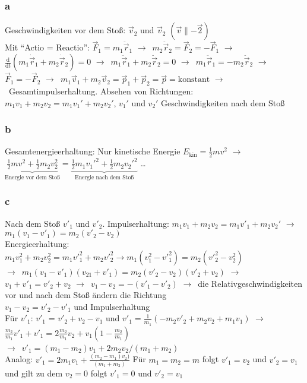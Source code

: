 \documentclass[oneside]{book}
\theoremstyle{definition}
\newcommand{\conseq}{$\rightarrow$~}
\renewcommand{\d}{\mathrm d}
\newcommand{\dd}[1]{\frac{\d}{\d #1}}
\newcommand{\dotvec}[1]{\dot{\vec{#1}}}
\newcommand{\ddotvec}[1]{\ddot{\vec{#1}}}
\begin{document}
\subsubsection{a}
Geschwindigkeiten vor dem Stoß: $\vec{v}_2$ und $\vec{v}_2$ $(\vec{v} \parallel - \vec{2})$\\
Mit "`Actio = Reactio"': $\vec{F}_1 = m_1 \ddotvec{r}_1$ \conseq $m_2 \ddotvec{r}_2 = \vec{F}_2 = - \vec{F}_1$ \conseq $\dd t (m_1 \dotvec{r}_1 + m_2 \dotvec{r}_2) = 0$ \conseq $m_1 \ddotvec{r}_1 + m_2 \ddotvec{r}_2 = 0$ \conseq $m_1 \ddotvec{r}_1 = -m_2 \ddotvec{r}_2$ \conseq $\vec{F}_1 = -\vec{F}_2$ \conseq $m_1 \vec{v}_1 + m_2 \vec{v}_2 = \vec{p}_1 + \vec{p}_2 = \vec{p} = \text{konstant}$ \conseq Gesamtimpulserhaltung. Absehen von Richtungen: $m_1 v_1 + m_2 v_2 = m_1 v_1' + m_2 v_2'$, $v_1'$ und $v_2'$ Geschwindigkeiten nach dem Stoß

\subsubsection{b}
Gesamtenergieerhaltung: Nur kinetische Energie $E_\text{kin} = \frac12 m v^2$ \conseq $\underbrace{\frac12 m v^2 + \frac12 m_2 v_2^2}_\text{Energie vor dem Stoß} = \underbrace{\frac12 m_1 v_1'^2 + \frac{1}{2} m_2 v_2'^2}_\text{Energie nach dem Stoß}$ \dots

\subsubsection{c}
Nach dem Stoß $v'_1$ und $v'_2$.
Impulserhaltung: $m_1v_1 +m_2v_2 = m_1v'_1+m_2v_2'$ \conseq $m_1(v_1 - v'_1) = m_2(v'_2 - v_2)$\\
Energieerhaltung: $m_1v_1^2 + m_2v_2^2 = m_1{v'}_1^2 + m_2{v'}_2^2 \rightarrow m_1(v_1^2-{v'}_1^2) = m_2({v'}_2^2 - v_2^2)$\\
\conseq $m_1(v_1-{v'}_1)(v_{21}+{v'}_1) = m_2 ({v'}_2 - v_2) ({v'}_2 + v_2)$
\conseq $v_1 + {v'}_1 = {v'}_2 + v_2$
\conseq $v_1 - v_2 = -({v'}_1 - {v'}_2)$ \conseq die Relativgeschwindigkeiten vor und nach dem Stoß ändern die Richtung\\
$v_1 - v_2 = {v'}_2-{v'}_1$ und Impulserhaltung\\
Für ${v'}_1$: ${v'}_1$ = ${v'}_2 + v_2 - v_1$ und ${v'}_1 = \frac{1}{m_1} (-m_2 {v'}_2 + m_2v_2 + m_1v_1)$ \conseq $\frac{m_2}{m_1} {v'}_1 + {v'}_1 = 2\frac{m_2}{m_1} v_2 + v_1 (1-\frac{m_2}{m_1})$\\
\conseq ${v'}_1 = (m_1 - m_2)v_1 + 2m_2v_2 / (m_1 + m_2)$\\
Analog: ${v'}_1 = 2m_1v_1 + \frac{(m_2 - m_1)v_2)}{(m_1 + m_2)}$
Für $m_1 = m_2 = m$ folgt ${v'}_1 = v_2$ und ${v'}_2 = v_1$
und gilt zu dem $v_2 = 0$ folgt ${v'}_1 = 0$ und ${v'}_2 = v_1$
\end{document}
